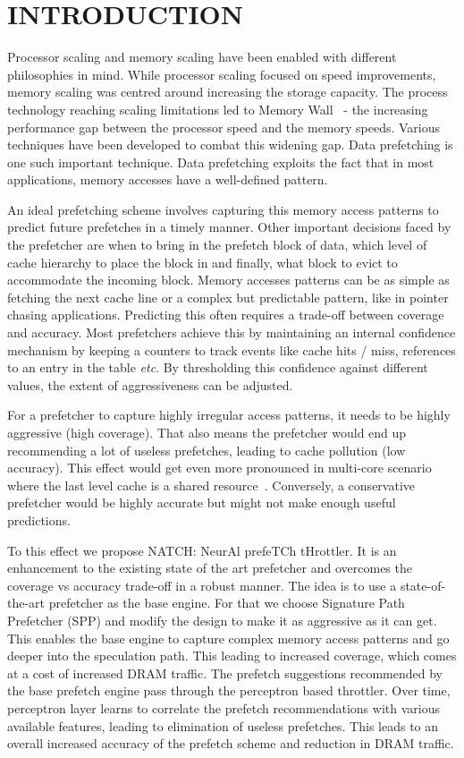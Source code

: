 \section{INTRODUCTION}
\label{Introduction}
Processor scaling and memory scaling have been enabled
with different philosophies in mind.  While processor scaling focused
on speed improvements, memory scaling was centred around increasing
the storage capacity.  The process technology reaching scaling
limitations led to Memory Wall~\cite{MemWall} - the increasing
performance gap between the processor speed and the memory speeds.
Various techniques have been developed to combat this widening gap.
Data prefetching is one such important technique.  Data prefetching
exploits the fact that in most applications, memory accesses have a
well-defined pattern.

An ideal prefetching scheme involves capturing this memory access
patterns to predict future prefetches in a timely manner.  Other
important decisions faced by the prefetcher are when to bring in the
prefetch block of data, which level of cache hierarchy to place the
block in and finally, what block to evict to accommodate the incoming
block.  Memory accesses patterns can be as simple as fetching the next
cache line or a complex but predictable pattern, like in pointer
chasing applications.  Predicting this often requires a trade-off
between coverage and accuracy.  
Most prefetchers achieve this by maintaining an internal confidence 
mechanism by keeping a counters to track events like cache hits / miss, 
references to an entry in the table \textit{etc}. By thresholding this 
confidence against different values, the extent of aggressiveness 
can be adjusted.

For a prefetcher to capture highly
irregular access patterns, it needs to be highly aggressive (high
coverage).  That also means the prefetcher would end up recommending a
lot of useless prefetches, leading to cache pollution (low accuracy).
This effect would get even more pronounced in multi-core scenario
where the last level cache is a shared resource~\cite{Friendly}.  Conversely, a
conservative prefetcher would be highly accurate but might not make
enough useful predictions.

To this effect we propose NATCH: NeurAl prefeTCh tHrottler.  It
is an enhancement to the existing state of the art prefetcher and
overcomes the coverage vs accuracy trade-off in a robust manner.  The
idea is to use a state-of-the-art prefetcher as the base engine.
For that we choose Signature Path Prefetcher (SPP) and 
modify the design to make it as aggressive as it can get.
This enables the base engine to capture complex memory access patterns 
and go deeper into the speculation path. This
leading to increased coverage, which comes at a cost of increased DRAM
traffic.  The prefetch suggestions
recommended by the base prefetch engine pass through the perceptron based throttler. 
Over time, perceptron layer learns to correlate the prefetch recommendations 
with various available features, leading to elimination of
useless prefetches. This leads to an overall increased accuracy of
the prefetch scheme and reduction in DRAM traffic.

